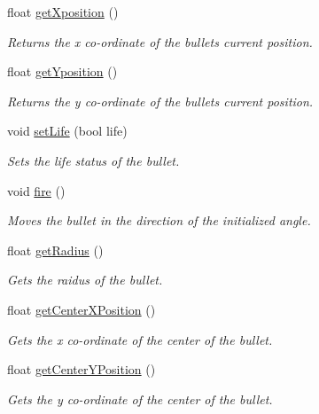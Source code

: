 \begin{DoxyCompactItemize}
float \hyperlink{class_player_bullet_aa9462c44892190316ee479a18693b6ad}{get\+Xposition} ()
\begin{DoxyCompactList}\small\item\em Returns the x co-\/ordinate of the bullets current position. \end{DoxyCompactList}\item 
float \hyperlink{class_player_bullet_a240cab35d5d909366986b8661ee65d3c}{get\+Yposition} ()
\begin{DoxyCompactList}\small\item\em Returns the y co-\/ordinate of the bullets current position. \end{DoxyCompactList}\item 
void \hyperlink{class_player_bullet_af713549c4bb9a2400a7929564f5b81ff}{set\+Life} (bool life)
\begin{DoxyCompactList}\small\item\em Sets the life status of the bullet. \end{DoxyCompactList}\item 
\mbox{\label{class_player_bullet_a4ef09e533d8d3016d7e08d9efae238ff}} 
void \hyperlink{class_player_bullet_a4ef09e533d8d3016d7e08d9efae238ff}{fire} ()
\begin{DoxyCompactList}\small\item\em Moves the bullet in the direction of the initialized angle. \end{DoxyCompactList}\item 
float \hyperlink{class_player_bullet_a1ff56e38b1447500d2887b6fe1eeb674}{get\+Radius} ()
\begin{DoxyCompactList}\small\item\em Gets the raidus of the bullet. \end{DoxyCompactList}\item 
float \hyperlink{class_player_bullet_a73c27dca47ea3fdcecd82ce4b2089c4a}{get\+Center\+X\+Position} ()
\begin{DoxyCompactList}\small\item\em Gets the x co-\/ordinate of the center of the bullet. \end{DoxyCompactList}\item 
float \hyperlink{class_player_bullet_a7ad2bc922595b9a11373fd42666926ef}{get\+Center\+Y\+Position} ()
\begin{DoxyCompactList}\small\item\em Gets the y co-\/ordinate of the center of the bullet. \end{DoxyCompactList}\end{DoxyCompactItemize}


